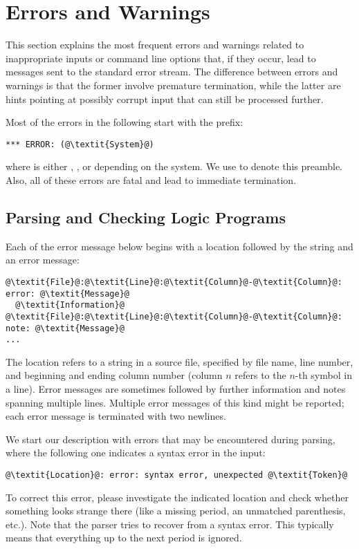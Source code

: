 \section{Errors and Warnings}\label{sec:error}

This section explains the most frequent errors and warnings 
related to inappropriate inputs or command line options that,
if they occur,
lead to messages sent to the standard error stream.
The difference between errors and warnings is that the former involve premature termination,
while the latter are hints pointing at possibly corrupt input that can still be processed further.

Most of the errors in the following start with the prefix:
\begin{lstlisting}[numbers=none,escapechar=@]
*** ERROR: (@\textit{System}@)
\end{lstlisting}
where  is either , , or  depending on the system.
We use  to denote this preamble.
Also, all of these errors are fatal and lead to immediate termination.

\subsection{Parsing and Checking Logic Programs}\label{subsec:error:parselp}

Each of the error message below begins with a location followed by the string  and an error message:
\begin{lstlisting}[numbers=none,escapechar=@]
@\textit{File}@:@\textit{Line}@:@\textit{Column}@-@\textit{Column}@: error: @\textit{Message}@
  @\textit{Information}@
@\textit{File}@:@\textit{Line}@:@\textit{Column}@-@\textit{Column}@: note: @\textit{Message}@
...

\end{lstlisting}
The location refers to a string in a source file, specified by file name, line number, and beginning and ending column number
(column $n$ refers to the $n$-th symbol in a line).
Error messages are sometimes followed by further information and notes spanning multiple lines.
Multiple error messages of this kind might be reported; 
each error message is terminated with two newlines.

We start our description with errors that may be encountered during parsing,
where the following one indicates a syntax error in the input:
%
\begin{lstlisting}[numbers=none,escapechar=@]
@\textit{Location}@: error: syntax error, unexpected @\textit{Token}@
\end{lstlisting}
%
To correct this error, please investigate the indicated location
and check whether something looks strange there
(like a missing period, an unmatched parenthesis, etc.).
Note that the parser tries to recover from a syntax error.
This typically means that everything up to the next period is ignored.

